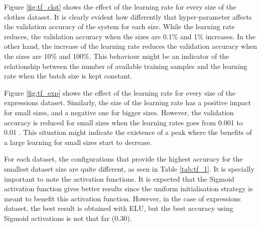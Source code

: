 \documentclass{article}
\begin{document}


Figure \ref{fig:tf_clot} shows the effect of the learning rate for every size of the clothes dataset. It is clearly evident how differently that hyper-parameter affects the validation accuracy of the system for each size. While the learning rate reduces, the validation accuracy when the sizes are 0.1\% and 1\% increases. In the other hand, the increase of the learning rate reduces the validation accuracy when the sizes are 10\% and 100\%. This behaviour might be an indicator of the relationship between the number of available training samples and the learning rate when the batch size is kept constant.

Figure \ref{fig:tf_exp} shows the effect of the learning rate for every size of the expressions dataset. Similarly, the size of the learning rate has a positive impact for small sizes, and a negative one for bigger sizes. However, the validation accuracy is reduced for small sizes when the learning rates goes from 0.001 to 0.01 . This situation might indicate the existence of a peak where the benefits of a large learning for small sizes start to decrease.

For each dataset, the configurations that provide the highest accuracy for the smallest dataset size are quite different, as seen in Table \ref{tab:tf_1}. It is specially important to note the activation functions. It is expected that the Sigmoid activation function gives better results since the uniform initialisation strategy is meant to benefit this activation function. However, in the case of expressions dataset, the best result is obtained with ELU, but the best accuracy using Sigmoid activations is not that far (0.30).
\end{document}
